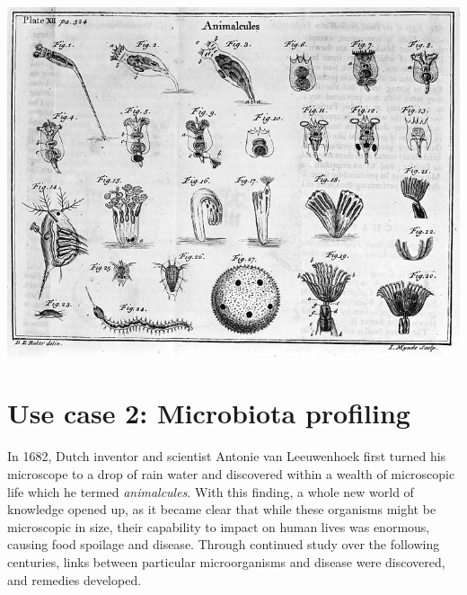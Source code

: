 \begin{justify}
\begin{center}
\begin{minipage}{5in}
\begin{center}
{\vspace*{1cm}
\includegraphics[scale=1.75]{chapters/images/mycrobiota/animalcules2.png}

}

\end{center}
\end{minipage}
\end{center}

\newpage


\section{Use case 2: Microbiota profiling}

In 1682, Dutch inventor and scientist Antonie van Leeuwenhoek first turned his microscope to a drop of rain water and discovered within a wealth of microscopic life which he termed \textit{animalcules}. With this finding, a whole new world of knowledge opened up, as it became clear that while these organisms might be microscopic in size, their capability to impact on human lives was enormous, causing food spoilage and disease. Through continued study over the following centuries, links between particular microorganisms and disease were discovered, and remedies developed.


\end{justify}
